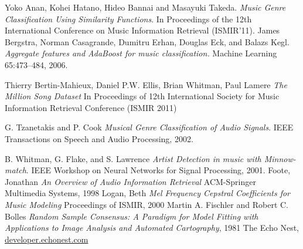\documentclass[twocolumn]{article}
\begin{document}
\begin{thebibliography}{99}
  Yoko Anan, Kohei Hatano, Hideo Bannai and Masayuki Takeda.
  \emph{Music Genre Classification Using Similarity Functions}.
  In Proceedings of the 12th International Conference on Music Information
  Retrieval (ISMIR'11).
  James Bergstra, Norman Casagrande, Dumitru Erhan, Douglas Eck, and Balazs
  Kegl.
  \emph{Aggregate features and AdaBoost for music classiﬁcation.}
  Machine Learning 65:473–484, 2006.
  
  Thierry Bertin-Mahieux, Daniel P.W. Ellis, Brian Whitman, Paul Lamere
  \emph{The Million Song Dataset}
  In Proceedings of 12th International Society for Music Information Retrieval Conference (ISMIR 2011)
  
	G. Tzanetakis and P. Cook
	\emph{Musical Genre Classification of Audio Signals}.
	IEEE Transactions on Speech and Audio Processing,
	2002.

	B. Whitman, G. Flake, and S. Lawrence
	\emph{Artist Detection in music with Minnow-match}.
	IEEE Workshop on Neural Networks for Signal Processing,
	2001.
	Foote, Jonathan
	\emph{An Overview of Audio Information Retrieval}
	ACM-Springer Multimedia Systems,
	1998
	Logan, Beth
	\emph{Mel Frequency Cepstral Coefficients for Music Modeling}
	Proceedings of ISMIR,
	2000
	Martin A. Fischler and Robert C. Bolles
	\emph{Random Sample Consensus: A Paradigm for Model Fitting with Applications to Image Analysis and Automated Cartography},
	1981
	The Echo Nest,
	\url{developer.echonest.com}
\end{thebibliography}
\end{document}
